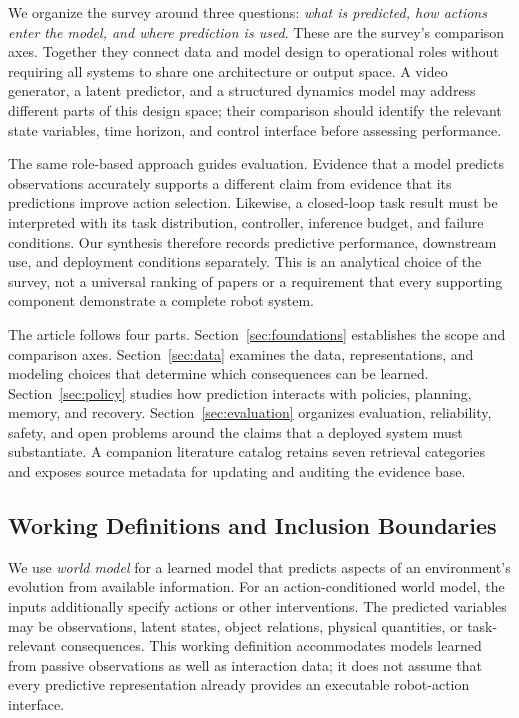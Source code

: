 We organize the survey around three questions: \emph{what is predicted, how actions enter the model, and where prediction is used}. These are the survey's comparison axes. Together they connect data and model design to operational roles without requiring all systems to share one architecture or output space. A video generator, a latent predictor, and a structured dynamics model may address different parts of this design space; their comparison should identify the relevant state variables, time horizon, and control interface before assessing performance.

The same role-based approach guides evaluation. Evidence that a model predicts observations accurately supports a different claim from evidence that its predictions improve action selection. Likewise, a closed-loop task result must be interpreted with its task distribution, controller, inference budget, and failure conditions. Our synthesis therefore records predictive performance, downstream use, and deployment conditions separately. This is an analytical choice of the survey, not a universal ranking of papers or a requirement that every supporting component demonstrate a complete robot system.

The article follows four parts. Section~\ref{sec:foundations} establishes the scope and comparison axes. Section~\ref{sec:data} examines the data, representations, and modeling choices that determine which consequences can be learned. Section~\ref{sec:policy} studies how prediction interacts with policies, planning, memory, and recovery. Section~\ref{sec:evaluation} organizes evaluation, reliability, safety, and open problems around the claims that a deployed system must substantiate. A companion literature catalog retains seven retrieval categories and exposes source metadata for updating and auditing the evidence base.

\subsection{Working Definitions and Inclusion Boundaries}
We use \emph{world model} for a learned model that predicts aspects of an environment's evolution from available information. For an action-conditioned world model, the inputs additionally specify actions or other interventions. The predicted variables may be observations, latent states, object relations, physical quantities, or task-relevant consequences. This working definition accommodates models learned from passive observations as well as interaction data; it does not assume that every predictive representation already provides an executable robot-action interface.

